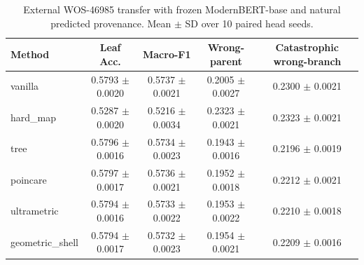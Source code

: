 \begin{table}[t]
\centering
\caption{External WOS-46985 transfer with frozen ModernBERT-base and natural predicted provenance. Mean $\pm$ SD over 10 paired head seeds.}
\label{tab:wos_external}
\begin{tabular}{lcccc}
\toprule
Method & Leaf Acc. & Macro-F1 & Wrong-parent & Catastrophic wrong-branch \\
\midrule
vanilla & 0.5793 $\pm$ 0.0020 & 0.5737 $\pm$ 0.0021 & 0.2005 $\pm$ 0.0027 & 0.2300 $\pm$ 0.0021 \\
hard\_map & 0.5287 $\pm$ 0.0020 & 0.5216 $\pm$ 0.0034 & 0.2323 $\pm$ 0.0021 & 0.2323 $\pm$ 0.0021 \\
tree & 0.5796 $\pm$ 0.0016 & 0.5734 $\pm$ 0.0023 & 0.1943 $\pm$ 0.0016 & 0.2196 $\pm$ 0.0019 \\
poincare & 0.5797 $\pm$ 0.0017 & 0.5736 $\pm$ 0.0021 & 0.1952 $\pm$ 0.0018 & 0.2212 $\pm$ 0.0021 \\
ultrametric & 0.5794 $\pm$ 0.0016 & 0.5733 $\pm$ 0.0022 & 0.1953 $\pm$ 0.0022 & 0.2210 $\pm$ 0.0018 \\
geometric\_shell & 0.5794 $\pm$ 0.0017 & 0.5732 $\pm$ 0.0023 & 0.1954 $\pm$ 0.0021 & 0.2209 $\pm$ 0.0016 \\
\bottomrule
\end{tabular}
\end{table}
